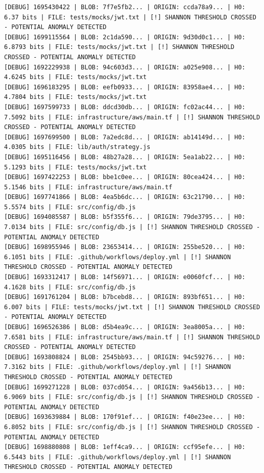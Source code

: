 \documentclass[12pt, a4paper, oneside]{report}
\begin{document}
\begin{lstlisting}[basicstyle=\tiny\ttfamily]
[DEBUG] 1695430422 | BLOB: 7f7e5fb2... | ORIGIN: ccda78a9... | H0: 6.37 bits | FILE: tests/mocks/jwt.txt | [!] SHANNON THRESHOLD CROSSED - POTENTIAL ANOMALY DETECTED
[DEBUG] 1699115564 | BLOB: 2c1da590... | ORIGIN: 9d30d0c1... | H0: 6.8793 bits | FILE: tests/mocks/jwt.txt | [!] SHANNON THRESHOLD CROSSED - POTENTIAL ANOMALY DETECTED
[DEBUG] 1692229938 | BLOB: 94c603d3... | ORIGIN: a025e908... | H0: 4.6245 bits | FILE: tests/mocks/jwt.txt
[DEBUG] 1696183295 | BLOB: eefb0933... | ORIGIN: 83958ae4... | H0: 4.7804 bits | FILE: tests/mocks/jwt.txt
[DEBUG] 1697599733 | BLOB: ddcd30db... | ORIGIN: fc02ac44... | H0: 7.5092 bits | FILE: infrastructure/aws/main.tf | [!] SHANNON THRESHOLD CROSSED - POTENTIAL ANOMALY DETECTED
[DEBUG] 1697699500 | BLOB: 7a2edc8d... | ORIGIN: ab14149d... | H0: 4.0305 bits | FILE: lib/auth/strategy.js
[DEBUG] 1695116456 | BLOB: 48b27a28... | ORIGIN: 5ea1ab22... | H0: 5.1293 bits | FILE: tests/mocks/jwt.txt
[DEBUG] 1697422253 | BLOB: bbe1c0ee... | ORIGIN: 80cea424... | H0: 5.1546 bits | FILE: infrastructure/aws/main.tf
[DEBUG] 1697741866 | BLOB: 4ea5b6dc... | ORIGIN: 63c21790... | H0: 5.5574 bits | FILE: src/config/db.js
[DEBUG] 1694085587 | BLOB: b5f355f6... | ORIGIN: 79de3795... | H0: 7.0134 bits | FILE: src/config/db.js | [!] SHANNON THRESHOLD CROSSED - POTENTIAL ANOMALY DETECTED
[DEBUG] 1698955946 | BLOB: 23653414... | ORIGIN: 255be520... | H0: 6.1051 bits | FILE: .github/workflows/deploy.yml | [!] SHANNON THRESHOLD CROSSED - POTENTIAL ANOMALY DETECTED
[DEBUG] 1693312417 | BLOB: 14f56971... | ORIGIN: e0060fcf... | H0: 4.1628 bits | FILE: src/config/db.js
[DEBUG] 1691761204 | BLOB: b7bcebd8... | ORIGIN: 893bf651... | H0: 6.007 bits | FILE: tests/mocks/jwt.txt | [!] SHANNON THRESHOLD CROSSED - POTENTIAL ANOMALY DETECTED
[DEBUG] 1696526386 | BLOB: d5b4ea9c... | ORIGIN: 3ea8005a... | H0: 7.6581 bits | FILE: infrastructure/aws/main.tf | [!] SHANNON THRESHOLD CROSSED - POTENTIAL ANOMALY DETECTED
[DEBUG] 1693808824 | BLOB: 2545bb93... | ORIGIN: 94c59276... | H0: 7.3162 bits | FILE: .github/workflows/deploy.yml | [!] SHANNON THRESHOLD CROSSED - POTENTIAL ANOMALY DETECTED
[DEBUG] 1699271228 | BLOB: 037cd054... | ORIGIN: 9a456b13... | H0: 6.9069 bits | FILE: src/config/db.js | [!] SHANNON THRESHOLD CROSSED - POTENTIAL ANOMALY DETECTED
[DEBUG] 1693639884 | BLOB: 170f91ef... | ORIGIN: f40e23ee... | H0: 6.8052 bits | FILE: src/config/db.js | [!] SHANNON THRESHOLD CROSSED - POTENTIAL ANOMALY DETECTED
[DEBUG] 1698880808 | BLOB: 1eff4ca9... | ORIGIN: ccf95efe... | H0: 6.5443 bits | FILE: .github/workflows/deploy.yml | [!] SHANNON THRESHOLD CROSSED - POTENTIAL ANOMALY DETECTED

\end{lstlisting}
\end{document}
